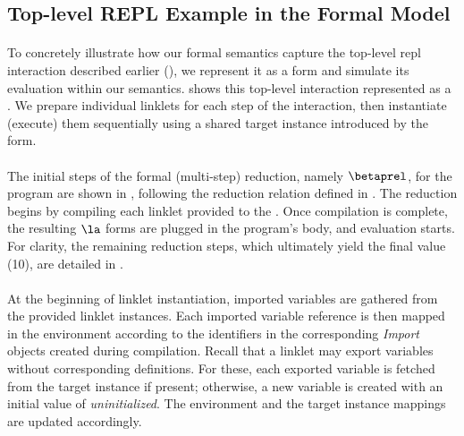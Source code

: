 		\subsection{Top-level REPL Example in the Formal Model}
		\label{subsec:toplevel-example-formal}


		\paragraph{}%
			To concretely illustrate how our formal semantics capture the top-level \gls{repl} interaction described earlier (), we represent it as a  form and simulate its evaluation within our semantics.  shows this top-level interaction represented as a . We prepare individual linklets for each step of the interaction, then instantiate (execute) them sequentially using a shared target instance introduced by the  form.

		\paragraph{}%
			The initial steps of the formal (multi-step) reduction, namely $\betaprel$, for the program are shown in , following the reduction relation defined in . The reduction begins by compiling each linklet provided to the . Once compilation is complete, the resulting $\la$ forms are plugged in the program's body, and evaluation starts. For clarity, the remaining reduction steps, which ultimately yield the final value (10), are detailed in .


		\paragraph{}%
			At the beginning of linklet instantiation, imported variables are gathered from the provided linklet instances. Each imported variable reference is then mapped in the environment according to the identifiers in the corresponding \emph{Import} objects created during compilation. Recall that a linklet may export variables without corresponding definitions. For these, each exported variable is fetched from the target instance if present; otherwise, a new variable is created with an initial value of \emph{uninitialized}. The environment and the target instance mappings are updated accordingly.

